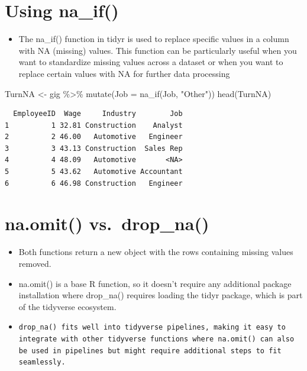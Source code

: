 \documentclass[
  letterpaper,
  DIV=11,
  numbers=noendperiod]{scrreprt}
\newenvironment{Shaded}{\begin{snugshade}}{\end{snugshade}}
\newcommand{\AttributeTok}[1]{\textcolor[rgb]{0.40,0.45,0.13}{#1}}
\newcommand{\FunctionTok}[1]{\textcolor[rgb]{0.28,0.35,0.67}{#1}}
\newcommand{\NormalTok}[1]{\textcolor[rgb]{0.00,0.23,0.31}{#1}}
\newcommand{\OtherTok}[1]{\textcolor[rgb]{0.00,0.23,0.31}{#1}}
\newcommand{\SpecialCharTok}[1]{\textcolor[rgb]{0.37,0.37,0.37}{#1}}
\newcommand{\StringTok}[1]{\textcolor[rgb]{0.13,0.47,0.30}{#1}}
\providecommand{\tightlist}{%
  \setlength{\itemsep}{0pt}\setlength{\parskip}{0pt}}\usepackage{longtable,booktabs,array}
\begin{document}
\section{Using na\_if()}\label{using-na_if}

\begin{itemize}
\tightlist
\item
  The na\_if() function in tidyr is used to replace specific values in a
  column with NA (missing) values. This function can be particularly
  useful when you want to standardize missing values across a dataset or
  when you want to replace certain values with NA for further data
  processing
\end{itemize}

\begin{Shaded}
\begin{Highlighting}[]
\NormalTok{TurnNA }\OtherTok{\textless{}{-}}\NormalTok{ gig }\SpecialCharTok{\%\textgreater{}\%}
    \FunctionTok{mutate}\NormalTok{(}\AttributeTok{Job =} \FunctionTok{na\_if}\NormalTok{(Job, }\StringTok{"Other"}\NormalTok{))}
\FunctionTok{head}\NormalTok{(TurnNA)}
\end{Highlighting}
\end{Shaded}

\begin{verbatim}
  EmployeeID  Wage     Industry        Job
1          1 32.81 Construction    Analyst
2          2 46.00   Automotive   Engineer
3          3 43.13 Construction  Sales Rep
4          4 48.09   Automotive       <NA>
5          5 43.62   Automotive Accountant
6          6 46.98 Construction   Engineer
\end{verbatim}

\section{na.omit() vs.~drop\_na()}\label{na.omit-vs.-drop_na}

\begin{itemize}
\item
  Both functions return a new object with the rows containing missing
  values removed.
\item
  na.omit() is a base R function, so it doesn't require any additional
  package installation where drop\_na() requires loading the tidyr
  package, which is part of the tidyverse ecosystem.
\item
\begin{verbatim}
drop_na() fits well into tidyverse pipelines, making it easy to integrate with other tidyverse functions where na.omit() can also be used in pipelines but might require additional steps to fit seamlessly.
\end{verbatim}
\end{itemize}
\end{document}
